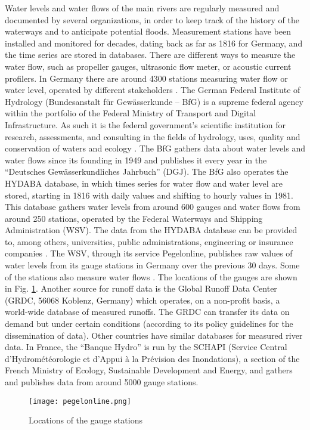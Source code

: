 Water levels and water flows of the main rivers are regularly measured and documented by several organizations, in order to keep track of the history of the waterways and to anticipate potential floods. Measurement stations have been installed and monitored for decades, dating back as far as 1816 for Germany, and the time series are stored in databases. There are different ways to measure the water flow, such as propeller gauges, ultrasonic flow meter, or acoustic current profilers. In Germany there are around 4300 stations measuring water flow or water level, operated by different stakeholders \cite{bafg_hyd}.  The German Federal Institute of Hydrology (Bundesanstalt für Gewässerkunde – BfG) is a supreme federal agency within the portfolio of the Federal Ministry of Transport and Digital Infrastructure. As such it is the federal government's scientific institution for research, assessments, and consulting in the fields of hydrology, uses, quality and conservation of waters and ecology \cite{bafg}. The BfG gathers data about water levels and water flows since its founding in 1949 and publishes it every year in the ``Deutsches Gewässerkundliches Jahrbuch'' (DGJ). The BfG also operates the HYDABA database, in which times series for water flow and water level are stored, starting in 1816 with daily values and shifting to hourly values in 1981. This database gathers water levels from around 600 gauges and water flows from around 250 stations, operated by the Federal Waterways and Shipping Administration (WSV). The data from the HYDABA database can be provided to, among others, universities, public administrations, engineering or insurance companies \cite{bafg_hyd}. \newline
The WSV, through its service Pegelonline, publishes raw values of water levels from its gauge stations in Germany over the previous 30 days. Some of the stations also measure water flows \cite{pegelonline}. The locations of the gauges are shown in Fig. \ref{pegelonline}.\newline
Another source for runoff data is the Global Runoff Data Center (GRDC, 56068 Koblenz, Germany) which operates, on a non-profit basis, a world-wide database of measured runoffs. The GRDC can transfer its data on demand but under certain conditions (according to its policy guidelines for the dissemination of data).\newline
Other countries have similar databases for measured river data. In France, the ``Banque Hydro'' is run by the SCHAPI (Service Central d'Hydrométéorologie et d'Appui à la Prévision des Inondations), a section of the French Ministry of Ecology, Sustainable Development and Energy, and gathers and publishes data from around 5000 gauge stations.
\begin{figure}[H]
\centering
\texttt{[image: pegelonline.png]}
\caption[Locations of the gauge stations]{Locations of the gauge stations \cite{pegelonline}}
\label{pegelonline}
\end{figure}


